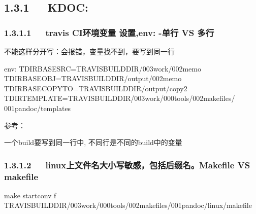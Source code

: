 \documentclass[letterpaper,12pt,english]{sphinxmanual}
\begin{document}
\subsection{1.3.1   KDOC:}
\label{\detokenize{001software/001install/001._u7f51_u7ad9/travisCI:kdoc}}

\subsubsection{1.3.1.1   travis CI环境变量 设置,env: -单行 VS 多行}
\label{\detokenize{001software/001install/001._u7f51_u7ad9/travisCI:travis-ci-env-vs}}
不能这样分开写：会报错，变量找不到，要写到同一行

\begin{sphinxVerbatim}[commandchars=\\\{\}]
env:
  \PYGZhy{} T\PYGZus{}DIR\PYGZus{}BASE\PYGZus{}SRC=\PYGZdl{}TRAVIS\PYGZus{}BUILD\PYGZus{}DIR/003work/002memo
  \PYGZhy{} T\PYGZus{}DIR\PYGZus{}BASE\PYGZus{}OBJ=\PYGZdl{}TRAVIS\PYGZus{}BUILD\PYGZus{}DIR/output/002memo
  \PYGZhy{} T\PYGZus{}DIR\PYGZus{}BASE\PYGZus{}COPYTO=\PYGZdl{}TRAVIS\PYGZus{}BUILD\PYGZus{}DIR/output/copy2
  \PYGZhy{} T\PYGZus{}DIR\PYGZus{}TEMPLATE=\PYGZdl{}TRAVIS\PYGZus{}BUILD\PYGZus{}DIR/003work/000tools/002makefiles/   001pandoc/templates
\end{sphinxVerbatim}

参考：


\begin{sphinxVerbatim}[commandchars=\\\{\}]
    
\end{sphinxVerbatim}

一个build要写到同一行中, 不同行是不同的build中的变量


\subsubsection{1.3.1.2   linux上文件名大小写敏感，包括后缀名。Makefile VS makefile}
\label{\detokenize{001software/001install/001._u7f51_u7ad9/travisCI:linux-makefile-vs-makefile}}
\begin{sphinxVerbatim}[commandchars=\\\{\}]
make startconv \PYGZhy{}f \PYGZdl{}TRAVIS\PYGZus{}BUILD\PYGZus{}DIR/003work/000tools/002makefiles/001pandoc/linux/makefile
\end{sphinxVerbatim}
\end{document}
